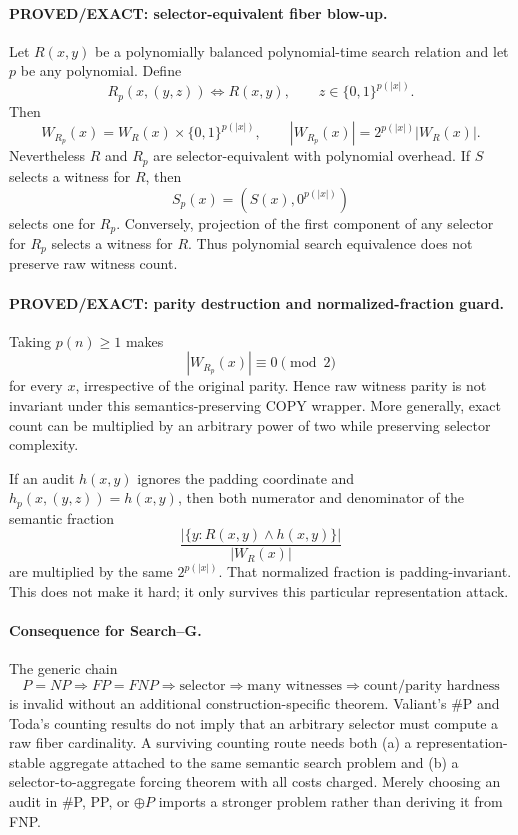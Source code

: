 \documentclass[11pt]{article}
\begin{document}
\paragraph{PROVED/EXACT: selector-equivalent fiber blow-up.}
Let $R(x,y)$ be a polynomially balanced polynomial-time search relation and let $p$ be any polynomial. Define
\[
R_p(x,(y,z))\iff R(x,y),\qquad z\in\{0,1\}^{p(|x|)}.
\]
Then
\[
W_{R_p}(x)=W_R(x)\times\{0,1\}^{p(|x|)},\qquad
|W_{R_p}(x)|=2^{p(|x|)}|W_R(x)|.
\]
Nevertheless $R$ and $R_p$ are selector-equivalent with polynomial overhead. If $S$ selects a witness for $R$, then
\[
S_p(x)=(S(x),0^{p(|x|)})
\]
selects one for $R_p$. Conversely, projection of the first component of any selector for $R_p$ selects a witness for $R$. Thus polynomial search equivalence does not preserve raw witness count.

\paragraph{PROVED/EXACT: parity destruction and normalized-fraction guard.}
Taking $p(n)\ge1$ makes
\[
|W_{R_p}(x)|\equiv0\pmod 2
\]
for every $x$, irrespective of the original parity. Hence raw witness parity is not invariant under this semantics-preserving COPY wrapper. More generally, exact count can be multiplied by an arbitrary power of two while preserving selector complexity.

If an audit $h(x,y)$ ignores the padding coordinate and $h_p(x,(y,z))=h(x,y)$, then both numerator and denominator of the semantic fraction
\[
\frac{|\{y:R(x,y)\wedge h(x,y)\}|}{|W_R(x)|}
\]
are multiplied by the same $2^{p(|x|)}$. That normalized fraction is padding-invariant. This does not make it hard; it only survives this particular representation attack.

\paragraph{Consequence for Search--G.}
The generic chain
\[
P=NP\Rightarrow FP=FNP\Rightarrow \text{selector}\Rightarrow
\text{many witnesses}\Rightarrow\text{count/parity hardness}
\]
is invalid without an additional construction-specific theorem. Valiant's \#P and Toda's counting results do not imply that an arbitrary selector must compute a raw fiber cardinality. A surviving counting route needs both (a) a representation-stable aggregate attached to the same semantic search problem and (b) a selector-to-aggregate forcing theorem with all costs charged. Merely choosing an audit in \#P, PP, or $\oplus P$ imports a stronger problem rather than deriving it from FNP.
\end{document}
